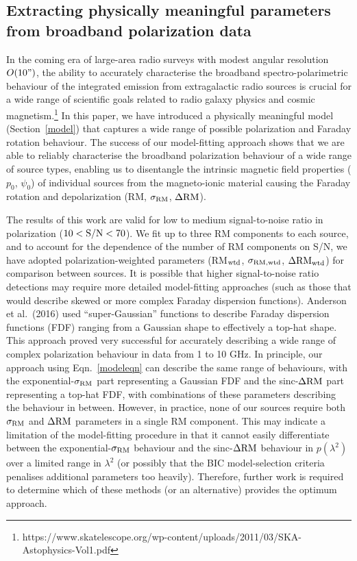 \documentclass{mnras}
\newcommand*\sigmaRM{\sigma_{\rm RM}}
\newcommand*\sigmaRMwtd{\sigma_{\rm RM, wtd}}
\newcommand*\gradRMwtd{\Delta{\rm RM_{wtd}}}
\newcommand*\DeltaRM{\Delta{\rm RM}}
\begin{document}
\subsection{Extracting physically meaningful parameters from broadband polarization data}
In the coming era of large-area radio surveys with modest angular resolution $O(10")$, the ability to accurately characterise the broadband spectro-polarimetric behaviour of the integrated emission from extragalactic radio sources is crucial for a wide range of scientific goals related to radio galaxy physics and cosmic magnetism.\footnote{https://www.skatelescope.org/wp-content/uploads/2011/03/SKA-Astophysics-Vol1.pdf} 
In this paper, we have introduced a physically meaningful model (Section~\ref{model}) 
that captures a wide range of possible polarization and Faraday rotation behaviour. The success of our model-fitting approach shows that we are able to reliably characterise the broadband polarization behaviour of a wide range of source types, enabling us to disentangle the intrinsic magnetic field properties ($p_0$, $\psi_0$) of individual sources from the magneto-ionic material causing the Faraday rotation and depolarization (RM, $\sigmaRM$, $\DeltaRM$). 

The results of this work are valid for low to medium signal-to-noise ratio in polarization ($10<{\rm S/N}<70$). We fit up to three RM components to each source, and to account for the dependence of the number of RM components on S/N, we have adopted polarization-weighted parameters (RM$_{\rm wtd}$, $\sigmaRMwtd$, $\gradRMwtd$) for comparison between sources. 
It is possible that higher signal-to-noise ratio detections may require more detailed model-fitting approaches (such as those that would describe skewed or more complex Faraday dispersion functions). Anderson et al.~(2016) used ``super-Gaussian'' functions to describe Faraday dispersion functions (FDF) ranging from a Gaussian shape to effectively a top-hat shape. This approach proved very successful for accurately describing a wide range of complex polarization behaviour in data from 1 to 10 GHz. In principle, our approach using Eqn.~\ref{modeleqn} can describe the same range of behaviours, with the exponential-$\sigmaRM$ part representing a Gaussian FDF and the sinc-$\DeltaRM$ part representing a top-hat FDF, with combinations of these parameters describing the behaviour in between. However, in practice, none of our sources require both $\sigmaRM$ and $\DeltaRM$ parameters in a single RM component. This may indicate a limitation of the model-fitting procedure in that it cannot easily differentiate between the exponential-$\sigmaRM$ behaviour and the sinc-$\DeltaRM$ behaviour in $p(\lambda^2)$ over a limited range in $\lambda^2$ (or possibly that the BIC model-selection criteria penalises additional parameters too heavily). Therefore, further work is required to determine which of these methods (or an alternative) provides the optimum approach. 
\end{document}
